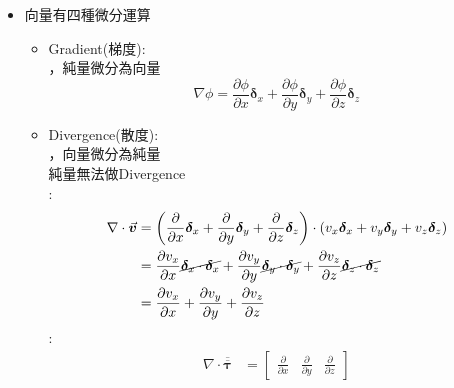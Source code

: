 \documentclass[../main.tex]{subfiles}
\begin{document}
\begin{itemize}
\begin{enumerate}
\begin{equation}
      \end{equation}
      \item Spherical coordinate:
      \begin{equation}
        \nabla = \frac{\partial }{\partial r}\bm \delta_r + \frac{1}{r}\frac{\partial }{\partial \theta}\bm \delta_{\theta} 
        + \frac{1}{r\sin\theta}\frac{\partial }{\partial \phi}\bm \delta_{\phi} 
      \end{equation}
    \end{enumerate}
  \item 向量有四種微分運算
    \begin{itemize}
      \item Gradient(梯度):\\
      ，純量微分為向量
      \begin{equation}
        \nabla \phi = \frac{\partial \phi}{\partial x}\bm \delta_x + \frac{\partial \phi}{\partial y}\bm \delta_y + \frac{\partial \phi}{\partial z}\bm \delta_z
      \end{equation}
      \item Divergence(散度):\\
      ，向量微分為純量\\
      純量無法做Divergence\\
      :
      \begin{align}
        \nabla \cdot \vec {\bm v} &= \left(
          \frac{\partial }{\partial x}\bm \delta_x + \frac{\partial }{\partial y}\bm \delta_y + \frac{\partial }{\partial z}\bm \delta_z
        \right)\cdot \left(
          v_x \bm \delta_x + v_y \bm \delta_y + v_z \bm \delta_z
        \right) \nonumber \\
        &= \frac{\partial v_x}{\partial x} \cancel{\bm \delta_x \cdot \bm \delta_x} + 
        \frac{\partial v_y}{\partial y} \cancel{\bm \delta_y \cdot \bm \delta_y} + 
        \frac{\partial v_z}{\partial z} \cancel{\bm \delta_z \cdot \bm \delta_z} \nonumber \\  
        &= \frac{\partial v_x}{\partial x} + \frac{\partial v_y}{\partial y} + \frac{\partial v_z}{\partial z}
      \end{align}
      :
      \begin{align}
        \nabla \cdot \overline{\overline {\bm \tau}} &= 
        \begin{bmatrix}
          \frac{\partial }{\partial x} & \frac{\partial }{\partial y} & \frac{\partial }{\partial z}

\end{bmatrix}
\end{align}
\end{itemize}
\end{itemize}
\end{document}
